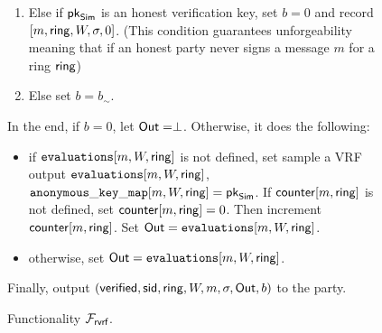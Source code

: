 \begin{figure}
\begin{tcolorbox}
{\begin{description}
\begin{enumerate}[label={{C}}{{\arabic*}}, start = 1]
		\item Else if $ \mathsf{pk}_{\mathsf{Sim}} $ is an honest verification key, set $ b = 0 $ and record $ [m, \mathsf{ring},W,\sigma, 0] $. (This condition guarantees unforgeability meaning that if an honest party never signs a message $ m $ for a ring $ \mathsf{ring} $)\label{cond:forgery}
		\item Else set $ b = b_\sim$. \label{cond:simulatorbit}
	\end{enumerate}
	In the end, if $ b = 0 $, let $ {\mathsf{Out}} = \perp $. Otherwise, it does the following:
	\begin{itemize}
		\item if $ \texttt{evaluations}[m,W,\mathsf{ring}] $ is not defined, set sample a VRF output $\texttt{evaluations}[m, W, \mathsf{ring}]$, $ \mathtt{anonymous\_key\_map}[m,W,\mathsf{ring}]  =  \mathsf{pk}_{\mathsf{Sim}}$. If $ \mathsf{counter}[m, \mathsf{ring}]  $ is not defined, set $ \mathsf{counter}[m, \mathsf{ring}]  = 0 $. Then increment $ \mathsf{counter}[m, \mathsf{ring}]  $. Set $ {\mathsf{Out}} = \texttt{evaluations}[m, W, \mathsf{ring}]$. 	
		\item otherwise, set $ {\mathsf{Out}} = \texttt{evaluations}[m, W, \mathsf{ring}]$. 	
	\end{itemize}
	Finally, output $(\mathsf{verified}, \textsf{sid}, \mathsf{ring},W, m, \sigma, {\mathsf{Out}}, b)$ to the party.
\end{description}

}
\end{tcolorbox}
\caption{Functionality $\mathcal{F}_{\textsf{rvrf}}$.\label{f:gvrf}}
\end{figure}



